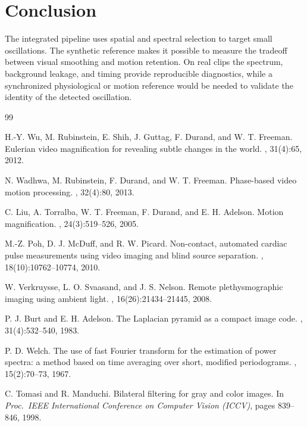 \documentclass[10pt,twocolumn,letterpaper]{article}
\begin{document}
\section{Conclusion}
The integrated pipeline uses spatial and spectral selection to target
small oscillations. The synthetic reference makes it possible to measure
the tradeoff between visual smoothing and motion retention. On real
clips the spectrum, background leakage, and timing provide reproducible
diagnostics, while a synchronized physiological or motion reference
would be needed to validate the identity of the detected oscillation.

{\small
\begin{thebibliography}{99}

H.-Y. Wu, M. Rubinstein, E. Shih, J. Guttag, F. Durand, and W. T. Freeman.
\newblock Eulerian video magnification for revealing subtle changes in the world.
, 31(4):65, 2012.

N. Wadhwa, M. Rubinstein, F. Durand, and W. T. Freeman.
\newblock Phase-based video motion processing.
, 32(4):80, 2013.

C. Liu, A. Torralba, W. T. Freeman, F. Durand, and E. H. Adelson.
\newblock Motion magnification.
, 24(3):519--526, 2005.

M.-Z. Poh, D. J. McDuff, and R. W. Picard.
\newblock Non-contact, automated cardiac pulse measurements using video imaging and blind source separation.
, 18(10):10762--10774, 2010.

W. Verkruysse, L. O. Svaasand, and J. S. Nelson.
\newblock Remote plethysmographic imaging using ambient light.
, 16(26):21434--21445, 2008.

P. J. Burt and E. H. Adelson.
\newblock The Laplacian pyramid as a compact image code.
, 31(4):532--540, 1983.

P. D. Welch.
\newblock The use of fast Fourier transform for the estimation of power spectra: a method based on time averaging over short, modified periodograms.
, 15(2):70--73, 1967.

C. Tomasi and R. Manduchi.
\newblock Bilateral filtering for gray and color images.
\newblock In {\em Proc.\ IEEE International Conference on Computer Vision (ICCV)}, pages 839--846, 1998.

\end{thebibliography}
}
\end{document}
